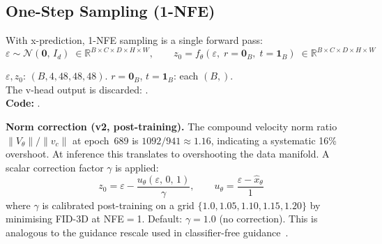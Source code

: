 \subsection{One-Step Sampling (1-NFE)}
\label{sec:1nfe}

With x-prediction, 1-NFE sampling is a single forward pass:
\begin{equation}
  \varepsilon \sim \mathcal{N}(\mathbf{0},\,I_d)
    \;\in \mathbb{R}^{B \times C \times D \times H \times W},
  \qquad
  z_0 = f_\theta(\varepsilon,\;r{=}\mathbf{0}_B,\;t{=}\mathbf{1}_B)
    \;\in \mathbb{R}^{B \times C \times D \times H \times W}
  \label{eq:1nfe_sampling}
\end{equation}
\begin{shapes}
$\varepsilon, z_0$: $(B, 4, 48, 48, 48)$.
\quad $r = \mathbf{0}_B$, $t = \mathbf{1}_B$: each $(B,)$.\\
The v-head output is discarded: .\\
\textbf{Code:} .
\end{shapes}

\textbf{Norm correction (v2, post-training).}  The compound velocity norm
ratio $\|V_\theta\|/\|v_c\|$ at epoch~689 is $1092/941 \approx 1.16$,
indicating a systematic 16\% overshoot.  At inference this translates to
overshooting the data manifold.  A scalar correction factor $\gamma$ is
applied:
\begin{equation}
  z_0 = \varepsilon - \frac{u_\theta(\varepsilon,\,0,\,1)}{\gamma},
  \qquad
  u_\theta = \frac{\varepsilon - \hat{x}_\theta}{\,1\,}
  \label{eq:norm_correction}
\end{equation}
where $\gamma$ is calibrated post-training on a grid $\{1.0, 1.05, 1.10,
1.15, 1.20\}$ by minimising FID-3D at NFE$=$1.  Default: $\gamma = 1.0$
(no correction).  This is analogous to the guidance rescale used in
classifier-free guidance~\cite{lin2024common}.
